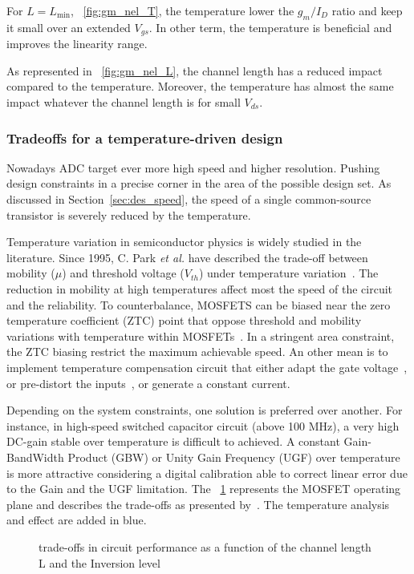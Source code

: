 For \(L = L_{\min}\), \figurename~\ref{fig:gm_nel_T}, the temperature lower the \(g_m/I_D\) ratio and keep it small over an extended \(V_{gs}\). In other term, the temperature is beneficial and improves the linearity range.

As represented in \figurename~\ref{fig:gm_nel_L}, the channel length has a reduced impact compared to the temperature. Moreover, the temperature has almost the same impact whatever the channel length is for small \(V_{ds}\).

\subsubsection{Tradeoffs for a temperature-driven design}
Nowadays ADC target ever more high speed and higher resolution. Pushing design constraints in a precise corner in the area of the possible design set. As discussed in Section~\ref{sec:des_speed}, the speed of a single common-source transistor is severely reduced by the temperature. 

Temperature variation in semiconductor physics is widely studied in the literature. Since 1995, C. Park \textit{et al.} have described the trade-off between mobility (\(\mu \)) and threshold voltage (\(V_{th} \)) under temperature variation~\cite{Park1995}. The reduction in mobility at high temperatures affect most the speed of the circuit and the reliability. To counterbalance, MOSFETS can be biased near the zero temperature coefficient (ZTC) point that oppose threshold and mobility variations with temperature within MOSFETs~\cite{Shoucair1986,Filanovsky2001}. In a stringent area constraint, the ZTC biasing restrict the maximum achievable speed. An other mean is to implement temperature compensation circuit that either adapt the gate voltage~\cite{Chen2011, Gomez2010}, or pre-distort the inputs~\cite{Sira2013}, or generate a constant current.

Depending on the system constraints, one solution is preferred over another. For instance, in high-speed switched capacitor circuit (above 100 MHz), a very high DC-gain stable over temperature is difficult to achieved. A constant Gain-BandWidth Product (GBW) or Unity Gain Frequency (UGF) over temperature is more attractive considering a digital calibration able to correct linear error due to the Gain and the UGF limitation. The \figurename~\ref{fig:tradeoffs} represents the MOSFET operating plane and describes the trade-offs as presented by~\cite{Binkley2003}. The temperature analysis and effect are added in blue.

\begin{figure}[!ht]
    \centering
    
    \caption{trade-offs in circuit performance as a function of the channel length L and the Inversion level}
    \label{fig:tradeoffs}
\end{figure}

